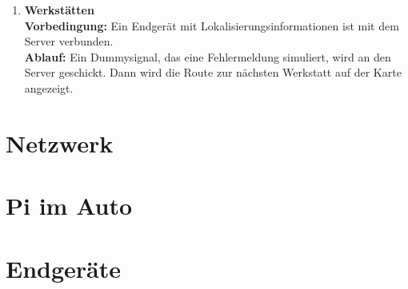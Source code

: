 \documentclass[pflichtenheft.tex]{subfiles}
\begin{document}
\begin{enumerate}
\item{\textbf{Werkstätten}} \\
\textbf{Vorbedingung: } Ein Endgerät mit Lokalisierungsinformationen ist mit dem
Server verbunden. \\
\textbf{Ablauf: } Ein Dummysignal, das eine Fehlermeldung simuliert, wird
an den Server geschickt. Dann wird die Route zur nächsten Werkstatt auf der
Karte angezeigt.



\end{enumerate}

\section{Netzwerk}
\section{Pi im Auto}
\section{Endgeräte}
\end{document}
